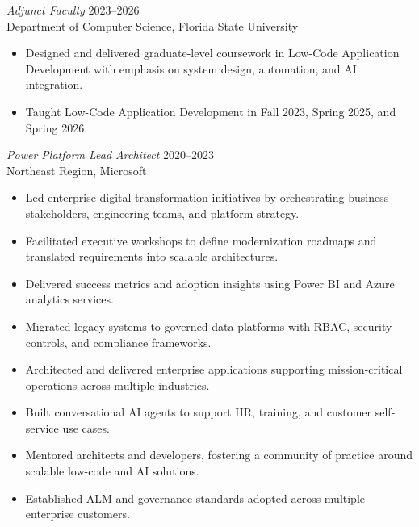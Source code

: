\documentclass[margin]{res}
\begin{document}
\begin{resume}
{\sl Adjunct Faculty} \hfill 2023--2026\\
Department of Computer Science, Florida State University
\begin{itemize}
\item Designed and delivered graduate-level coursework in Low-Code Application Development with emphasis on system design, automation, and AI integration.
\item Taught Low-Code Application Development in Fall 2023, Spring 2025, and Spring 2026.
\end{itemize}

{\sl Power Platform Lead Architect} \hfill 2020--2023\\
Northeast Region, Microsoft
\begin{itemize}
\item Led enterprise digital transformation initiatives by orchestrating business stakeholders, engineering teams, and platform strategy.
\item Facilitated executive workshops to define modernization roadmaps and translated requirements into scalable architectures.
\item Delivered success metrics and adoption insights using Power BI and Azure analytics services.
\item Migrated legacy systems to governed data platforms with RBAC, security controls, and compliance frameworks.
\item Architected and delivered enterprise applications supporting mission-critical operations across multiple industries.
\item Built conversational AI agents to support HR, training, and customer self-service use cases.
\item Mentored architects and developers, fostering a community of practice around scalable low-code and AI solutions.
\item Established ALM and governance standards adopted across multiple enterprise customers.
\end{itemize}


\end{resume}
\end{document}
